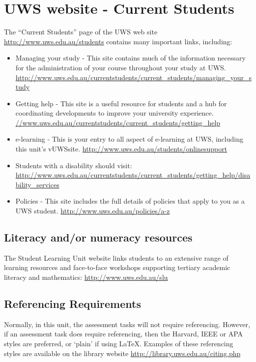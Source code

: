 \documentclass[a4paper,oneside]{book}
\newcommand{\vuws}{vUWS}
\begin{document}
\section{UWS website - Current Students}
The ``Current Students'' page of the UWS web site
\url{http://www.uws.edu.au/students} contains many important links,
including:
\begin{itemize}
\item Managing your study - This site contains much of the information
  necessary for the administration of your course throughout your
  study at UWS.
  \url{http://www.uws.edu.au/currentstudents/current_students/managing_your_study}
\item Getting help - This site is a useful resource for students and a
  hub for coordinating developments to improve your university
  experience.
  \url{//www.uws.edu.au/currentstudents/current_students/getting_help}
\item e-learning - This is your entry to all aspect of e-learning at
  UWS, including this unit's \vuws site.
  \url{http://www.uws.edu.au/students/onlinesupport}
\item Students with a disability should visit:
  \url{http://www.uws.edu.au/currentstudents/current_students/getting_help/disability_services}
\item Policies - This site includes the full details of policies that
  apply to you as a UWS student.
  \url{http://www.uws.edu.au/policies/a-z}
\end{itemize}


\subsection*{Literacy and/or numeracy resources}

The Student Learning Unit website links students to an extensive range
of learning resources and face-to-face workshops supporting tertiary
academic literacy and mathematics: \url{http://www.uws.edu.au/slu}

\subsection*{Referencing Requirements}
Normally, in this unit, the assessment tasks will not require
referencing.  However, if an assessment task does require referencing,
then the Harvard, IEEE or APA styles are preferred, or `plain' if using LaTeX.
Examples of these referencing styles are
available on the library website \url{http://library.uws.edu.au/citing.php}
\end{document}
